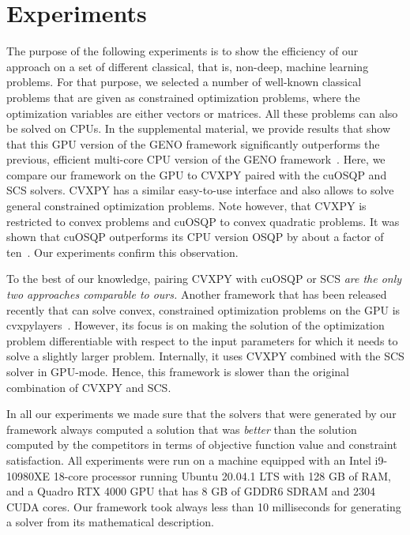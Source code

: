 \documentclass[letterpaper]{article} %
\begin{document}
\section{Experiments} \label{sec:experiments}
The purpose of the following experiments is to show the efficiency of our approach on a set of different classical, that is, non-deep, machine learning problems. For that purpose, we selected a number of well-known classical problems that are given as constrained optimization problems, where the optimization variables are either vectors or matrices. All these problems can also be solved on CPUs. %
In the supplemental material, we provide results that show that this GPU version of the GENO framework significantly outperforms the previous, efficient multi-core CPU version of the GENO framework~\cite{LaueMG2019}.
Here, we compare our framework on the GPU to CVXPY paired with the cuOSQP and SCS solvers. CVXPY has a similar easy-to-use interface and also allows to solve general constrained optimization problems. Note however, that CVXPY is restricted to convex problems and cuOSQP to convex quadratic problems. It was shown that cuOSQP outperforms its CPU version OSQP by about a factor of ten~\cite{SchubigerBL20}. Our experiments confirm this observation.

To the best of our knowledge, pairing CVXPY with \mbox{cuOSQP} or SCS \emph{are the only two approaches comparable to ours.} %
Another framework that has been released recently that can solve convex, constrained optimization problems on the GPU is cvxpylayers~\cite{AgrawalABBDK19}. However, its focus is on making the solution of the optimization problem differentiable with respect to the input parameters for which it needs to solve a slightly larger problem. Internally, it uses CVXPY combined with the SCS solver in GPU-mode. Hence, this framework is slower than the original combination of CVXPY and SCS. %

In all our experiments we made sure that the solvers that were generated by our framework always computed a solution that was \emph{better} than the solution computed by the competitors in terms of objective function value and constraint satisfaction. All experiments were run on a machine equipped with an Intel i9-10980XE 18-core processor running Ubuntu 20.04.1 LTS with 128 GB of RAM, and a Quadro RTX 4000 GPU that has 8 GB of GDDR6 SDRAM and 2304 CUDA cores. Our framework took always less than 10 milliseconds for generating a solver from its mathematical description. %
\nocite{GiesenL16,FunkeLS17,FunkeLS16}
\end{document}

